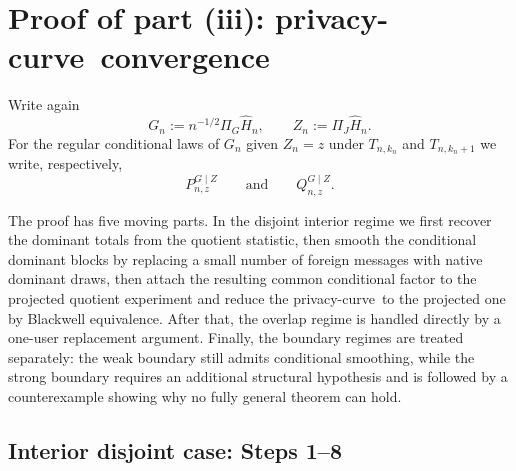 \documentclass{article}
\newcommand{\1}{\mathbf 1}
\newcommand{\privacycurve}{\mbox{privacy-curve}}
\begin{document}
\section{\texorpdfstring{Proof of part (iii): \privacycurve\ convergence}{Proof of part (iii): privacy-curve convergence}}
\label{sec:proof-iii}

Write again
\[
G_n:=n^{-1/2}\Pi_G\widehat H_n,
\qquad
Z_n:=\Pi_J\widehat H_n.
\]
For the regular conditional laws of $G_n$ given $Z_n=z$ under $T_{n,k_n}$ and $T_{n,k_n+1}$ we write,
respectively,
\[
P_{n,z}^{G\mid Z}
\qquad\text{and}\qquad
Q_{n,z}^{G\mid Z}.
\]


The proof has five moving parts. In the disjoint interior regime we first recover the dominant totals from the
quotient statistic, then smooth the conditional dominant blocks by replacing a small number of foreign messages
with native dominant draws, then attach the resulting common conditional factor to the projected quotient
experiment and reduce the \privacycurve\ to the projected one by Blackwell equivalence. After that, the overlap
regime is handled directly by a one-user replacement argument. Finally, the boundary regimes are treated
separately: the weak boundary still admits conditional smoothing, while the strong boundary requires an
additional structural hypothesis and is followed by a counterexample showing why no fully general theorem can hold.

\subsection*{Interior disjoint case: Steps 1--8}
\end{document}
